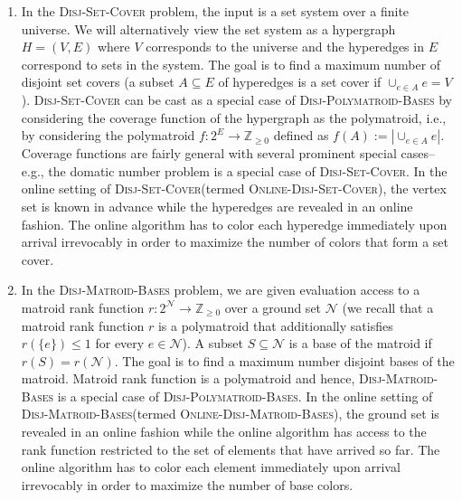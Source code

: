 \documentclass[11pt]{article}
\theoremstyle{definition}
\newcommand{\calN}{{\mathcal{N}}}
\newcommand{\Z}{\mathbb{Z}}
\newcommand{\DPB}{\textsc{Disj-Polymatroid-Bases}\xspace}
\newcommand{\DSC}{\textsc{Disj-Set-Cover}\xspace}
\newcommand{\ODSC}{\textsc{Online-Disj-Set-Cover}\xspace}
\newcommand{\DMB}{\textsc{Disj-Matroid-Bases}\xspace}
\newcommand{\ODMB}{\textsc{Online-Disj-Matroid-Bases}\xspace}
\begin{document}
\begin{enumerate}
\item In the \DSC problem, the input is a set system over a finite universe. We will alternatively view the set system as a hypergraph $H=(V, E)$ where $V$ corresponds to the universe and the hyperedges in $E$ correspond to sets in the system. The goal is to find a maximum number of disjoint set covers (a subset $A\subseteq E$ of hyperedges is a set cover if $\cup_{e\in A}e = V$). \DSC can be cast as a special case of \DPB by considering the coverage function of the hypergraph as the polymatroid, i.e., by considering the polymatroid $f: 2^E\rightarrow \Z_{\ge 0}$ defined as $f(A):=|\cup_{e\in A}e|$. Coverage functions are fairly general with several prominent special cases--e.g., the domatic number problem is a special case of \DSC \cite{FHKS02}. In the online setting of \DSC (termed \ODSC), the vertex set is known in advance while the hyperedges are revealed in an online fashion. The online algorithm has to color each hyperedge immediately upon arrival irrevocably in order to maximize the number of colors that form a set cover.



\item In the \DMB problem, we are given 
evaluation access to a matroid rank function $r:2^\calN\rightarrow \Z_{\ge 0}$ over a ground set $\calN$ (we recall that a matroid rank function $r$ is a polymatroid that additionally satisfies $r(\{e\})\le 1$ for every $e\in \calN$). A subset $S\subseteq \calN$ is a base of the matroid if $r(S)=r(\calN)$. The goal is to find a maximum number disjoint bases of the matroid. Matroid rank function is a polymatroid and hence, \DMB is a special case of \DPB. In the online setting of \DMB (termed \ODMB), the ground set is revealed in an online fashion while the online algorithm has access to the rank function restricted to the set of elements that have arrived so far. The online algorithm has to color each element immediately upon arrival irrevocably in order to maximize the number of base colors. \end{enumerate}
\end{document}
